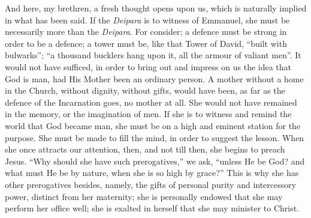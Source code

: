 And here, my brethren, a fresh thought opens upon us, which is
naturally implied in what has been said. If the \emph{Deipara} is to
witness of Emmanuel, she must be necessarily more than the \emph{Deipara}.
For consider; a defence must be strong in order to be a defence; a
tower must be, like that Tower of David, ``built with
bulwarks''; ``a thousand bucklers hang upon it, all the armour
of valiant men''. It would not have sufficed, in order to bring
out and impress on us the idea that God is man, had His Mother been an
ordinary person. A mother without a home in the Church, without
dignity, without gifts, would have been, as far as the defence of the
Incarnation goes, no mother at all. She would not have remained in the
memory, or the imagination of men. If she is to witness and remind the
world that God became man, she must be on a high and eminent station
for the purpose. She must be made to fill the mind, in order to
suggest the lesson. When she once attracts our attention, then, and
not till then, she begins to preach Jesus. ``Why should she have
such prerogatives,'' we ask, ``unless He be God? and what must
He be by nature, when she is so high by grace?'' This is why she
has other prerogatives besides, namely, the gifts of personal purity
and intercessory power, distinct from her maternity; she is personally
endowed that she may perform her office well; she is exalted in
herself that she may minister to Christ.

